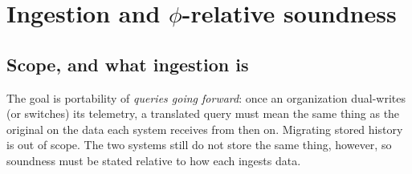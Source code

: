 
\section{Ingestion and \texorpdfstring{$\phi$}{phi}-relative soundness}
\label{sec:ingestion}

\subsection{Scope, and what ingestion is}

\noindent
The goal is portability of \emph{queries going forward}: once an organization
dual-writes (or switches) its telemetry, a translated query must mean the same thing
as the original on the data each system receives from then on. Migrating stored history
is out of scope. The two systems still do not store the same thing, however, so
soundness must be stated relative to how each ingests data.


